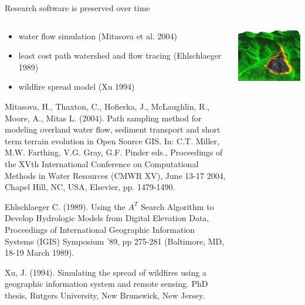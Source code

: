 \documentclass[xcolor={dvipsnames,usenames},beamer,aspectratio=169]{beamer}
\begin{document}
\begin{frame}{Research software is preserved over time}

\begin{columns}
\begin{column}{0.5\textwidth}

\begin{itemize}
  \item water flow simulation (Mitasova et al. 2004)
  \item least cost path watershed and flow tracing (Ehlschlaeger 1989)
  \item wildfire spread model (Xu 1994)
\end{itemize}

\bigskip
\footnoterule
\tiny

Mitasova, H., Thaxton, C., Hofierka, J., McLaughlin, R., Moore, A., Mitas L. (2004). Path sampling method for modeling overland water flow, sediment transport and short term terrain evolution in Open Source GIS. In: C.T. Miller, M.W. Farthing, V.G. Gray, G.F. Pinder eds., Proceedings of the XVth International Conference on Computational Methods in Water Resources (CMWR XV), June 13-17 2004, Chapel Hill, NC, USA, Elsevier, pp. 1479-1490.

Ehlschlaeger C. (1989). Using the $A^T$ Search Algorithm to Develop Hydrologic Models from Digital Elevation Data, Proceedings of International Geographic Information Systems (IGIS) Symposium '89, pp 275-281 (Baltimore, MD, 18-19 March 1989).

Xu, J. (1994). Simulating the spread of wildfires using a geographic information system and remote sensing. PhD thesis, Rutgers University, New Brunswick, New Jersey.

\end{column}
\begin{column}{0.5\textwidth}
\centering
\includegraphics[width=\textwidth]{fire_spread}


\end{column}
\end{columns}
\end{frame}
\end{document}
